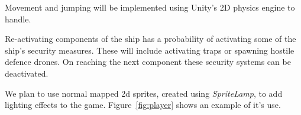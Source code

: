 Movement and jumping will be implemented using Unity's 2D physics engine to handle.

Re-activating components of the ship has a probability of activating some of the ship's security measures. These will include activating traps or spawning hostile defence drones. On reaching the next component these security systems can be deactivated.

We plan to use normal mapped 2d sprites, created using \textit{SpriteLamp}, to add lighting effects to the game. Figure~\ref{fig:player} shows an example of it's use.